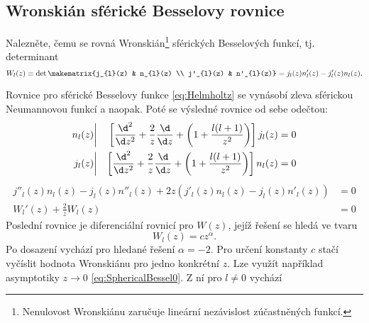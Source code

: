 \subsection{Wronskián sférické Besselovy rovnice}
Nalezněte, čemu se rovná Wronskián\footnote{
    Nenulovost Wronskiánu zaručuje lineární nezávislost zúčastněných funkcí.
}
sférických Besselových funkcí, tj. determinant
\begin{equation}
    W_{l}(z)
        \equiv\det\makematrix{j_{l}(z) & n_{l}(z) \\ j'_{l}(z) & n'_{l}(z)}
        =j_{l}(z)n'_{l}(z)-j'_{l}(z)n_{l}(z).
\end{equation}

\begin{solution}
    Rovnice pro sférické Besselovy funkce \eqref{eq:Helmholtz} se vynásobí zleva sférickou Neumannovou funkcí a naopak.
    Poté se výsledné rovnice od sebe odečtou:
    \begin{subequations}
        \begin{align}
            n_{l}(z)&\bigg|
            &\left[\frac{\d^{2}}{\d z^{2}}+\frac{2}{z}\frac{\d}{\d z}+
                        \left(1+\frac{l(l+1)}{z^{2}}\right)\right]j_{l}(z)
            &=0\\
            j_{l}(z)&\bigg|
            &\left[\frac{\d^{2}}{\d z^{2}}+\frac{2}{z}\frac{\d}{\d z}+
                        \left(1+\frac{l(l+1)}{z^{2}}\right)\right]n_{l}(z)
            &=0
        \end{align}            
    \end{subequations}
    \begin{subequations}
        \begin{align}
            j''_{l}(z)n_{l}(z)-j_{l}(z)n''_{l}(z)+2z(j'_{l}(z)n_{l}(z)-j_{l}(z)n'_{l}(z))
                &=0\\
            W_{l}'(z)+\frac{2}{z}W_{l}(z)
                &=0
        \end{align}            
    \end{subequations}
    Poslední rovnice je diferenciální rovnicí pro $W(z)$, jejíž řešení se hledá ve tvaru
    \begin{equation}
        W_{l}(z)=cz^{\alpha}.
    \end{equation}
    Po dosazení vychází pro hledané řešení $\alpha=-2$.
    Pro určení konstanty $c$ stačí vyčíslit hodnota Wronskiánu pro jedno konkrétní $z$.
    Lze využít například asymptotiky $z\rightarrow0$ \eqref{eq:SphericalBessel0}.
    Z ní pro $l\neq0$ vychází
    \begin{subequations}

\end{subequations}
\end{solution}
